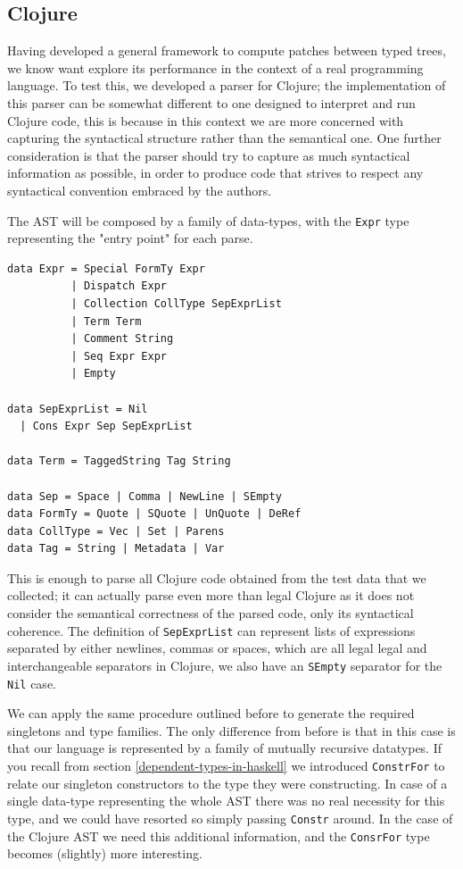 \documentclass[11pt, titlepage]{article}
\newcommand{\toHaskell}[1]{\texttt{#1}\xspace}
\begin{document}
\subsection{Clojure}
Having developed a general framework to compute patches between typed trees, we know want explore its performance in the context of a real programming language.
To test this, we developed a parser for Clojure; the implementation of this parser can be somewhat different to one designed to interpret and run Clojure code, this is because in this context we are more concerned with capturing the syntactical structure rather than the semantical one. One further consideration is that the parser should try to capture as much syntactical information as possible, in order to produce code that strives to respect any syntactical convention embraced by the authors.

The AST will be composed by a family of data-types, with the \toHaskell{Expr} type representing the "entry point" for each parse. 

\begin{verbatim}
data Expr = Special FormTy Expr
          | Dispatch Expr
          | Collection CollType SepExprList
          | Term Term 
          | Comment String
          | Seq Expr Expr
          | Empty
          
data SepExprList = Nil
  | Cons Expr Sep SepExprList
 
data Term = TaggedString Tag String

data Sep = Space | Comma | NewLine | SEmpty
data FormTy = Quote | SQuote | UnQuote | DeRef
data CollType = Vec | Set | Parens
data Tag = String | Metadata | Var
\end{verbatim}

This is enough to parse all Clojure code obtained from the test data that we collected; it can actually parse even more than legal Clojure as it does not consider the semantical correctness of the parsed code, only its syntactical coherence. The definition of \toHaskell{SepExprList} can represent lists of expressions separated by either newlines, commas or spaces, which are all legal legal and interchangeable separators in Clojure, we also have an \toHaskell{SEmpty} separator for the \toHaskell{Nil} case.

We can apply the same procedure outlined before to generate the required singletons and type families. The only difference from before is that in this case is that our language is represented by a family of mutually recursive datatypes. If you recall from section \ref{dependent-types-in-haskell} we introduced \toHaskell{ConstrFor} to relate our singleton constructors to the type they were constructing. In case of a single data-type representing the whole AST there was no real necessity for this type, and we could have resorted so simply passing \toHaskell{Constr} around. In the case of the Clojure AST we need this additional information, and the \toHaskell{ConsrFor} type becomes (slightly) more interesting.
\end{document}
